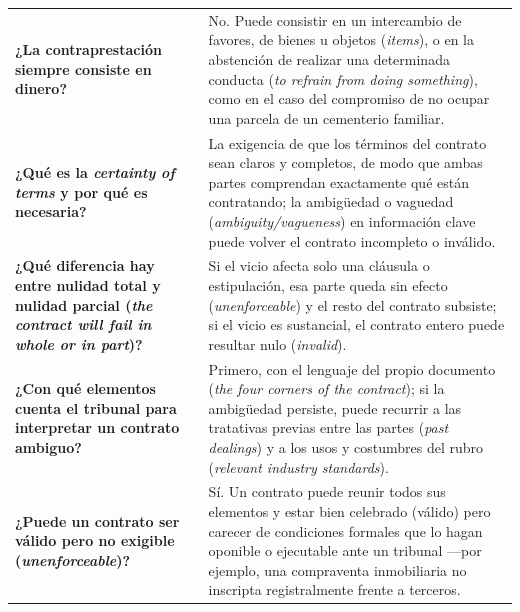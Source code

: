 \documentclass[12pt,oneside]{book}
\begin{document}
\begin{longtable}{
    >{\raggedright\arraybackslash\bfseries}p{}
    >{\raggedright\arraybackslash}p{}
}
¿La contraprestación siempre consiste en dinero? &
No. Puede consistir en un intercambio de favores, de bienes u objetos (\textit{items}), o en la abstención de realizar una determinada conducta (\textit{to refrain from doing something}), como en el caso del compromiso de no ocupar una parcela de un cementerio familiar. \\

¿Qué es la \textit{certainty of terms} y por qué es necesaria? &
La exigencia de que los términos del contrato sean claros y completos, de modo que ambas partes comprendan exactamente qué están contratando; la ambigüedad o vaguedad (\textit{ambiguity/vagueness}) en información clave puede volver el contrato incompleto o inválido. \\

¿Qué diferencia hay entre nulidad total y nulidad parcial (\textit{the contract will fail in whole or in part})? &
Si el vicio afecta solo una cláusula o estipulación, esa parte queda sin efecto (\textit{unenforceable}) y el resto del contrato subsiste; si el vicio es sustancial, el contrato entero puede resultar nulo (\textit{invalid}). \\

¿Con qué elementos cuenta el tribunal para interpretar un contrato ambiguo? &
Primero, con el lenguaje del propio documento (\textit{the four corners of the contract}); si la ambigüedad persiste, puede recurrir a las tratativas previas entre las partes (\textit{past dealings}) y a los usos y costumbres del rubro (\textit{relevant industry standards}). \\

¿Puede un contrato ser válido pero no exigible (\textit{unenforceable})? &
Sí. Un contrato puede reunir todos sus elementos y estar bien celebrado (válido) pero carecer de condiciones formales que lo hagan oponible o ejecutable ante un tribunal —por ejemplo, una compraventa inmobiliaria no inscripta registralmente frente a terceros. \\


\end{longtable}
\end{document}
